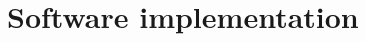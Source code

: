 \documentclass[a4paper]{paper}
\newcommand{\Field}{\mathbb{F}}
\DeclareMathOperator{\rest}{\pi}
\newcommand{\cF}{\mathcal{F}}
\begin{document}
%

\section{Software implementation}
\end{document}
